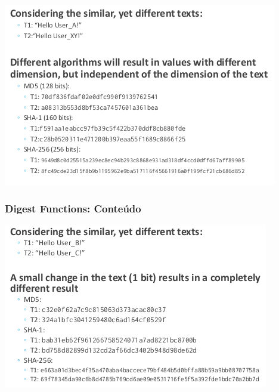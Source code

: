 \documentclass{article}
\begin{document}
\begin{center}
  \includegraphics[scale=0.4]{94}
\end{center}

\pagebreak

\subsubsection{Digest Functions: Conteúdo}

\begin{center}
  \includegraphics[scale=0.4]{95}
\end{center}
\end{document}
